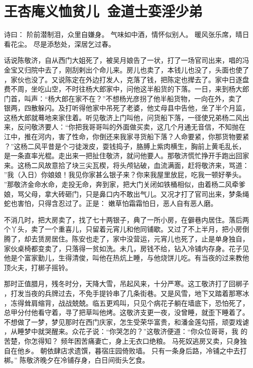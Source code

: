 \chapter{王杏庵义恤贫儿~金道士娈淫少弟}

诗曰：
阶前潜制泪，众里自嫌身。
气味如中酒，情怀似别人。
暖风张乐席，晴日看花尘。
尽是添愁处，深居乞过春。

话说陈敬济，自从西门大姐死了，被吴月娘告了一状，打了一场官司出来，唱的冯
金宝又归院中去了，刚刮剌出个命儿来。房儿也卖了，本钱儿也没了，头面也使了
，家伙也没了。又说陈定在外边打发人，克落了钱，把陈定也撵去了。家中日逐盘
费不周，坐吃山空，不时往杨大郎家中，问他这半船货的下落。一日，来到杨大郎
门首，叫声：“杨大郎在家不在？”不想杨光彦拐了他半船货物，一向在外，卖了
银两，四散躲闪。及打听得他家中吊死了老婆，他丈母县中告他，坐了半个月监，
这杨大郎就蓦地来家住着。听见敬济上门叫他，问货船下落，一径使兄弟杨二风出
来，反问敬济要人：“你把我哥哥叫的外面做买卖，这几个月通无音信，不知抛在
江中，推在河内，害了性命，你倒还来我家寻货船下落？人命要紧，你那货物要紧
？”这杨二风平昔是个刁徒泼皮，耍钱捣子，胳膊上紫肉横生，胸前上黄毛乱长，
是一条直率光棍。走出来一把扯住敬济，就问他要人。那敬济慌忙挣开手跑出回家
来。这杨二风故意拾了块三尖瓦楔，将头颅钻破，血流满面，赶将敬济来，骂道：
”我（入日）你娘娘！我见你家甚么银子来？你来我屋里放屁，吃我一顿好拳头。
”那敬济金命水命，走投无命，奔到家，把大门关闭如铁桶相似，由着杨二风牵爹
娘，骂父母，拿大砖砸门，只是鼻口内不敢出气儿。又况才打了官司出来，梦条绳
蛇也害怕，只得含忍过了。正是：
嫩草怕霜霜怕日，恶人自有恶人磨。

不消几时，把大房卖了，找了七十两银子，典了一所小房，在僻巷内居住。落后两
个丫头，卖了一个重喜儿，只留着元宵儿和他同铺歇。又过了不上半月，把小房倒
腾了，却去赁房居住。陈安也走了，家中没营运，元宵儿也死了，止是单身独自，
家伙桌椅都变卖了，只落得一贫如洗。未几，房钱不给，钻入冷铺内存身。花子见
他是个富家勤儿，生得清俊，叫他在热炕上睡，与他烧饼儿吃。有当夜的过来教他
顶火夫，打梆子摇铃。

那时正值腊月，残冬时分，天降大雪，吊起风来，十分严寒。这工敬济打了回梆子
，打发当夜的兵牌过去，不免手提铃串了几条街巷。又是风雪，地下又踏着那寒冰
，冻得耸肩缩背，战战兢兢。临五更鸡叫，只见个病花子躺在墙底下，恐怕死了，
总甲分付他看守着，寻了把草叫他烤。这敬济支更一夜，没曾睡，就歪下睡着了。
不想做了一梦，梦见那时在西门庆家，怎生受荣华富贵，和潘金莲勾搭，顽耍戏谑
，从睡梦中就哭醒来。众花子说：“你哭怎的？”这敬济便道：“你众位哥哥，我
的苦楚，你怎得知？
频年困苦痛妻亡，身上无衣口绝粮。
马死奴逃房又卖，只身独自在他乡。
朝依肆店求遗馔，暮宿庄园倚败墙。
只有一条身后路，冷铺之中去打梆。”
陈敬济晚夕在冷铺存身，白日间街头乞食。

